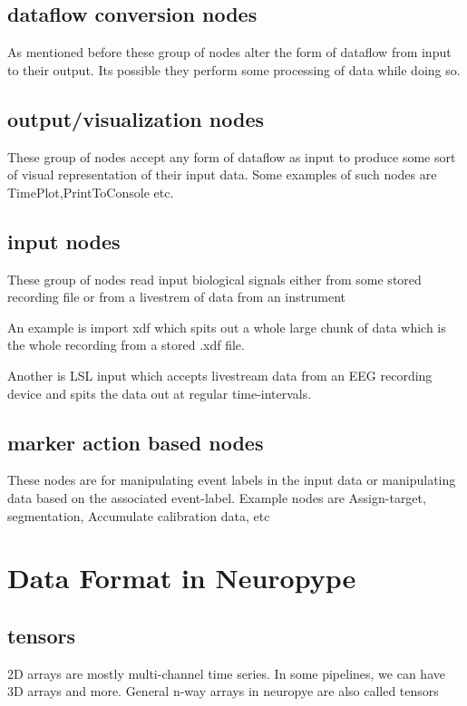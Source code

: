 \documentclass[16pt]{book}
\begin{document}
\section{dataflow conversion nodes} 
\par\noindent As mentioned before these group of nodes alter the form of dataflow from input to their output. 
Its possible they perform some processing of data while doing so.
\section{output/visualization nodes}
\par\noindent These group of nodes accept any form of dataflow as input to produce some sort of visual representation 
of their input data. Some examples of such nodes are TimePlot,PrintToConsole etc.
\section{input nodes}
\par\noindent These group of nodes read input biological signals either from some stored recording file or from a 
livestrem of data from an instrument
\par\noindent An example is import xdf which spits out a whole large chunk of data which is the whole recording from a 
stored .xdf file.
\par\noindent Another is LSL input which accepts livestream data from an EEG recording device and spits the data out at 
regular time-intervals.
\section{marker action based nodes}
\par\noindent These nodes are for manipulating event labels in the input data or manipulating data based on the 
associated event-label. Example nodes are Assign-target, segmentation, Accumulate calibration data, etc

\chapter{Data Format in Neuropype}
\section{tensors}
\par\noindent 2D arrays are mostly multi-channel time series. In some pipelines, we can have 3D arrays and more.
General n-way arrays in neuropye are also called tensors
\end{document}
